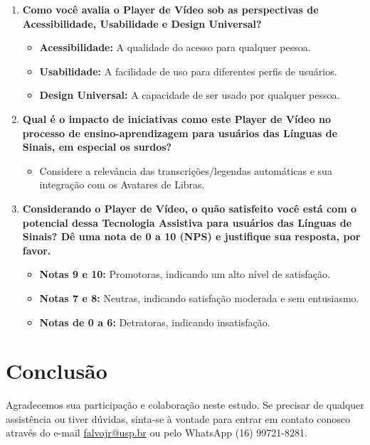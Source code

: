\begin{enumerate}
\item \textbf{Como você avalia o Player de Vídeo sob as perspectivas de Acessibilidade, Usabilidade e Design Universal?}
\begin{itemize}
    \item \textbf{Acessibilidade:} A qualidade do acesso para qualquer pessoa.
    \item \textbf{Usabilidade:} A facilidade de uso para diferentes perfis de usuários.
    \item \textbf{Design Universal:} A capacidade de ser usado por qualquer pessoa.
\end{itemize}

\item \textbf{Qual é o impacto de iniciativas como este Player de Vídeo no processo de ensino-aprendizagem para usuários das Línguas de Sinais, em especial os surdos?}

\begin{itemize}
    \item Considere a relevância das transcrições/legendas automáticas e sua integração com os Avatares de Libras.
\end{itemize}

\item \textbf{Considerando o Player de Vídeo, o quão satisfeito você está com o potencial dessa Tecnologia Assistiva para usuários das Línguas de Sinais? Dê uma nota de 0 a 10 (NPS) e justifique sua resposta, por favor.}

\begin{itemize}
    \item \textbf{Notas 9 e 10:} Promotoras, indicando um alto nível de satisfação.
    \item \textbf{Notas 7 e 8:} Neutras, indicando satisfação moderada e sem entusiasmo.
    \item \textbf{Notas de 0 a 6:} Detratoras, indicando insatisfação.
\end{itemize}
\end{enumerate}

\section{Conclusão}

\noindent
Agradecemos sua participação e colaboração neste estudo. Se precisar de qualquer assistência ou tiver dúvidas, sinta-se à vontade para entrar em contato conosco através do e-mail \url{falvojr@usp.br} ou pelo WhatsApp (16) 99721-8281.